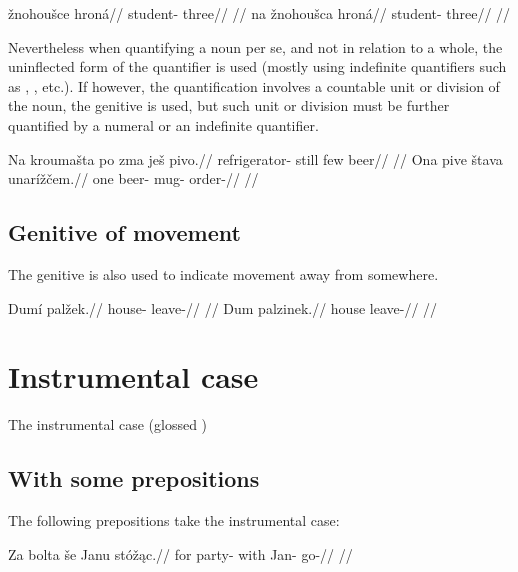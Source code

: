 \pex
\a
\begingl
\gla *\v{z}nohou\v{s}ce hron\'a//
\glb student- three//
\glft {}//
\endgl
\a
\begingl
\gla na \v{z}nohou\v{s}ca hron\'a//
\glb {} student- three//
\glft {}//
\endgl
\xe

Nevertheless when quantifying a noun per se, and not in relation to a whole, the uninflected form of the quantifier is used (mostly using indefinite quantifiers such as , , etc.). If however, the quantification involves a countable unit or division of the noun, the genitive is used, but such unit or division must be further quantified by a numeral or an indefinite quantifier.

\pex
\a
\begingl
\gla Na krouma\v{s}ta po zma je\v{s} pivo.//
\glb {} refrigerator- still few  beer//
\glft {}//
\endgl
\a
\begingl
\gla Ona pive \v{s}tava unar\'i\v{z}\v{c}em.//
\glb one beer- mug- order-//
\glft {}//
\endgl
\xe

\subsection{Genitive of movement}

The genitive is also used to indicate movement away from somewhere.

\pex
\a
\begingl
\gla Dum\'i pal\v{z}ek.//
\glb house- leave-//
\glft {}//
\endgl
\a
\begingl
\gla Dum palzinek.//
\glb house leave-//
\glft {}//
\endgl
\xe

\section{Instrumental case}

The instrumental case (glossed )

\subsection{With some prepositions}

The following prepositions take the instrumental case:  

\pex
\begingl
\gla Za bolta \v{s}e Janu st\'o\v{z}\k{a}c.//
\glb for party- with Jan- go-//
\glft {}//
\endgl
\xe

